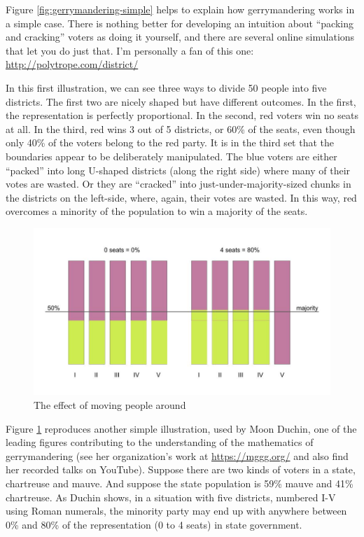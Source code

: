\documentclass[
  openany]{book}
\begin{document}
Figure \ref{fig:gerrymandering-simple} helps to explain how gerrymandering works in a simple case. There is nothing better for developing an intuition about ``packing and cracking'' voters as doing it yourself, and there are several online simulations that let you do just that. I'm personally a fan of this one: \url{http://polytrope.com/district/}

In this first illustration, we can see three ways to divide 50 people into five districts. The first two are nicely shaped but have different outcomes. In the first, the representation is perfectly proportional. In the second, red voters win no seats at all. In the third, red wins 3 out of 5 districts, or 60\% of the seats, even though only 40\% of the voters belong to the red party. It is in the third set that the boundaries appear to be deliberately manipulated. The blue voters are either ``packed'' into long U-shaped districts (along the right side) where many of their votes are wasted. Or they are ``cracked'' into just-under-majority-sized chunks in the districts on the left-side, where, again, their votes are wasted. In this way, red overcomes a minority of the population to win a majority of the seats.

\begin{figure}

{\centering \includegraphics[width=0.9\linewidth]{images/gerrymandering2} 

}

\caption{The effect of moving people around}\label{fig:gerrymandering-simple2}
\end{figure}

Figure \ref{fig:gerrymandering-simple2} reproduces another simple illustration, used by Moon Duchin, one of the leading figures contributing to the understanding of the mathematics of gerrymandering (see her organization's work at \url{https://mggg.org/} and also find her recorded talks on YouTube). Suppose there are two kinds of voters in a state, chartreuse and mauve. And suppose the state population is 59\% mauve and 41\% chartreuse. As Duchin shows, in a situation with five districts, numbered I-V using Roman numerals, the minority party may end up with anywhere between 0\% and 80\% of the representation (0 to 4 seats) in state government.
\end{document}
